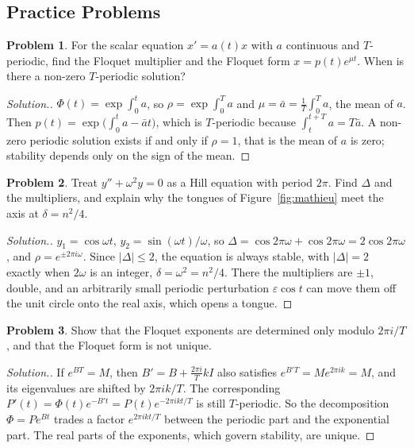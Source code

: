 \documentclass[11pt,a4paper]{article}
\numberwithin{equation}{section}
\theoremstyle{definition}
\newtheorem{problemx}{Problem}[subsection]
\newenvironment{problem}{\begin{problemx}}{\end{problemx}}
\newenvironment{solution}
  {\renewcommand{\qedsymbol}{}\begin{proof}[\textit{Solution}.]}
  {\end{proof}}
\begin{document}
\subsection{Practice Problems}

\begin{problem}
For the scalar equation $x' = a(t)x$ with $a$ continuous and $T$-periodic, find the Floquet multiplier and the Floquet form $x = p(t)e^{\mu t}$. When is there a non-zero $T$-periodic solution?
\end{problem}

\begin{solution}
$\Phi(t) = \exp\int_0^ta$, so $\rho = \exp\int_0^Ta$ and $\mu = \bar a = \frac1T\int_0^Ta$, the mean of $a$. Then $p(t) = \exp\bigl(\int_0^ta - \bar at\bigr)$, which is $T$-periodic because $\int_t^{t+T}a = T\bar a$. A non-zero periodic solution exists
if and only if $\rho = 1$, that is the mean of $a$ is zero; stability depends only on the sign of the mean.
\end{solution}

\begin{problem}
Treat $y'' + \omega^2y = 0$ as a Hill equation with period $2\pi$. Find $\Delta$ and the multipliers, and explain why the tongues of Figure~\ref{fig:mathieu} meet the axis at $\delta = n^2/4$.
\end{problem}

\begin{solution}
$y_1 = \cos\omega t$, $y_2 = \sin(\omega t)/\omega$, so $\Delta = \cos2\pi\omega + \cos2\pi\omega = 2\cos2\pi\omega$, and $\rho = e^{\pm2\pi i\omega}$. Since $|\Delta| \leq 2$, the equation is always stable, with $|\Delta| = 2$ exactly when $2\omega$ is an
integer, $\delta = \omega^2 = n^2/4$. There the multipliers are $\pm1$, double, and an arbitrarily small periodic perturbation $\varepsilon\cos t$ can move them off the unit circle onto the real axis,
which opens a tongue.
\end{solution}

\begin{problem}
Show that the Floquet exponents are determined only modulo $2\pi i/T$, and that the Floquet form is not unique.
\end{problem}

\begin{solution}
If $e^{BT} = M$, then $B' = B + \frac{2\pi i}{T}kI$ also satisfies $e^{B'T} = Me^{2\pi ik} = M$, and its eigenvalues are shifted by $2\pi ik/T$. The corresponding $P'(t) = \Phi(t)e^{-B't} = P(t)e^{-2\pi ikt/T}$ is still $T$-periodic. So
the decomposition $\Phi = Pe^{Bt}$ trades a factor $e^{2\pi ikt/T}$ between the periodic part and the exponential part. The real parts of the exponents, which govern stability, are unique.
\end{solution}
\end{document}
